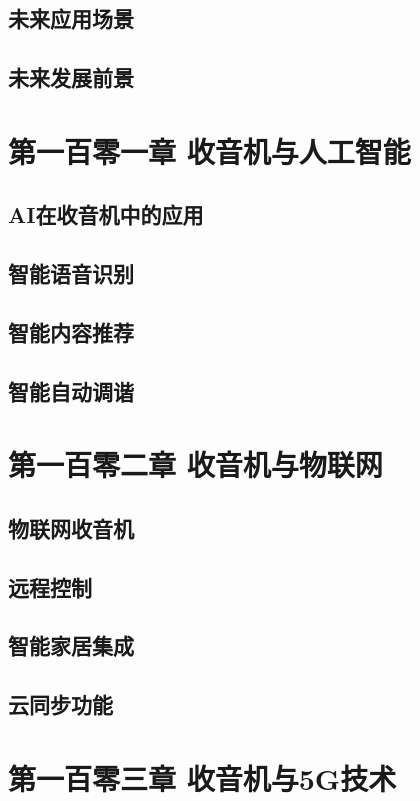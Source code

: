 \documentclass[12pt,UTF8]{ctexbook}
\begin{document}
\section{未来应用场景}
\section{未来发展前景}

\chapter{第一百零一章 收音机与人工智能}

\section{AI在收音机中的应用}
\section{智能语音识别}
\section{智能内容推荐}
\section{智能自动调谐}

\chapter{第一百零二章 收音机与物联网}

\section{物联网收音机}
\section{远程控制}
\section{智能家居集成}
\section{云同步功能}

\chapter{第一百零三章 收音机与5G技术}
\end{document}

